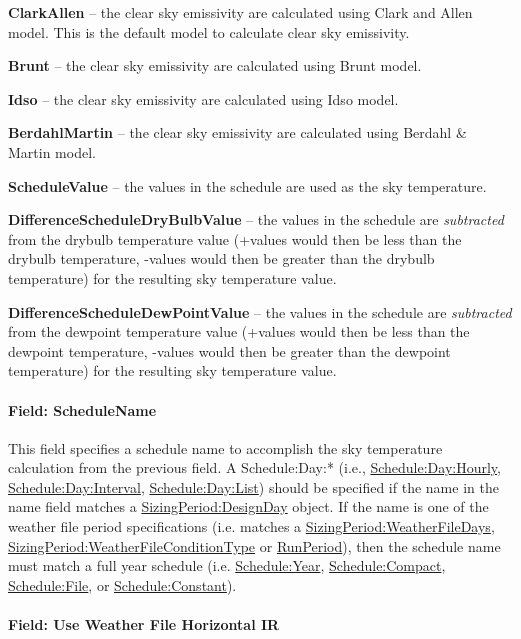 \textbf{ClarkAllen} -- the clear sky emissivity are calculated using Clark and Allen model. This is the default model to calculate clear sky emissivity.

\textbf{Brunt} -- the clear sky emissivity are calculated using Brunt model.

\textbf{Idso} -- the clear sky emissivity are calculated using Idso model.

\textbf{BerdahlMartin} -- the clear sky emissivity are calculated using Berdahl \& Martin model.

\textbf{ScheduleValue} -- the values in the schedule are used as the sky temperature.

\textbf{DifferenceScheduleDryBulbValue} -- the values in the schedule are \emph{subtracted} from the drybulb temperature value (+values would then be less than the drybulb temperature, -values would then be greater than the drybulb temperature) for the resulting sky temperature value.

\textbf{DifferenceScheduleDewPointValue} -- the values in the schedule are \emph{subtracted} from the dewpoint temperature value (+values would then be less than the dewpoint temperature, -values would then be greater than the dewpoint temperature) for the resulting sky temperature value.

\paragraph{Field: ScheduleName}\label{field-schedulename}

This field specifies a schedule name to accomplish the sky temperature calculation from the previous field. A Schedule:Day:* (i.e., \hyperref[scheduledayhourly]{Schedule:Day:Hourly}, \hyperref[scheduledayinterval]{Schedule:Day:Interval}, \hyperref[scheduledaylist]{Schedule:Day:List}) should be specified if the name in the name field matches a \hyperref[sizingperioddesignday]{SizingPeriod:DesignDay} object. If the name is one of the weather file period specifications (i.e. matches a \hyperref[sizingperiodweatherfiledays]{SizingPeriod:WeatherFileDays}, \hyperref[sizingperiodweatherfileconditiontype]{SizingPeriod:WeatherFileConditionType} or \hyperref[runperiod]{RunPeriod}), then the schedule name must match a full year schedule (i.e. \hyperref[scheduleyear]{Schedule:Year}, \hyperref[schedulecompact]{Schedule:Compact}, \hyperref[schedulefile]{Schedule:File}, or \hyperref[scheduleconstant]{Schedule:Constant}).

\paragraph{Field: Use Weather File Horizontal IR}\label{field-use-weather-file-hori-ir}

